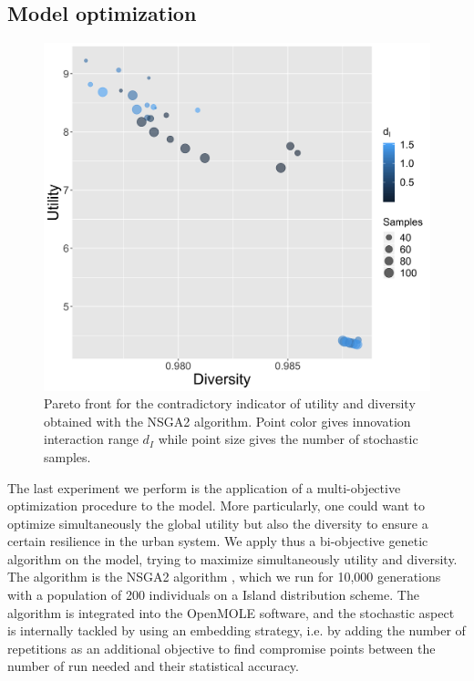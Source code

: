\documentclass[letterpaper]{article}
\begin{document}
\subsection{Model optimization}

\begin{figure}[t]
	\centering
	\includegraphics[width=\linewidth]{figures/paretoDiversity-Utility_colorinnovationDecay.png}
	\caption{Pareto front for the contradictory indicator of utility and diversity obtained with the NSGA2 algorithm. Point color gives innovation interaction range $d_I$ while point size gives the number of stochastic samples.\label{fig:pareto}}
\end{figure}

The last experiment we perform is the application of a multi-objective optimization procedure to the model. More particularly, one could want to optimize simultaneously the global utility but also the diversity to ensure a certain resilience in the urban system. We apply thus a bi-objective genetic algorithm on the model, trying to maximize simultaneously utility and diversity. The algorithm is the NSGA2 algorithm \citep{deb2002fast}, which we run for 10,000 generations with a population of 200 individuals on a Island distribution scheme. The algorithm is integrated into the OpenMOLE software, and the stochastic aspect is internally tackled by using an embedding strategy, i.e. by adding the number of repetitions as an additional objective to find compromise points between the number of run needed and their statistical accuracy.
\end{document}
